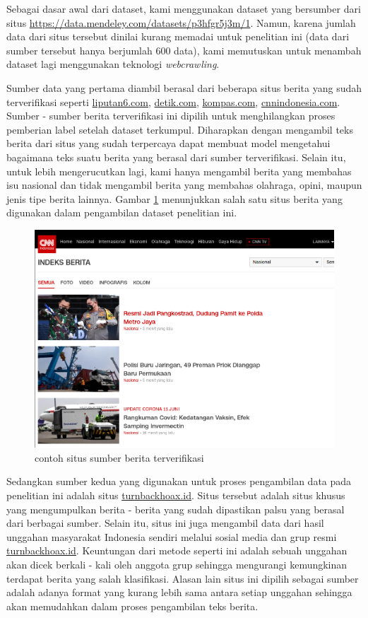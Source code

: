 Sebagai dasar awal dari dataset, kami menggunakan dataset yang bersumber dari situs \url{https://data.mendeley.com/datasets/p3hfgr5j3m/1}. Namun, karena jumlah data dari situs tersebut dinilai kurang memadai untuk penelitian ini (data dari sumber tersebut hanya berjumlah 600 data), kami memutuskan untuk menambah dataset lagi menggunakan teknologi \textit{webcrawling}.

Sumber data yang pertama diambil berasal dari beberapa situs berita yang sudah terverifikasi seperti \url{liputan6.com}, \url{detik.com}, \url{kompas.com}, \url{cnnindonesia.com}. Sumber - sumber berita terverifikasi ini dipilih untuk menghilangkan proses pemberian label setelah dataset terkumpul. Diharapkan dengan mengambil teks berita dari situs yang sudah terpercaya dapat membuat model mengetahui bagaimana teks suatu berita yang berasal dari sumber terverifikasi. Selain itu, untuk lebih mengerucutkan lagi, kami hanya mengambil berita yang membahas isu nasional dan tidak mengambil berita yang membahas olahraga, opini, maupun jenis tipe berita lainnya. Gambar \ref{fig: news_source} menunjukkan salah satu situs berita yang digunakan dalam pengambilan dataset penelitian ini.

\begin{figure}[h!]
  \begin{center}
    \includegraphics[width= .9\linewidth]{gambar/cnn_news.png}
    \caption{contoh situs sumber berita terverifikasi}
    \label{fig: news_source}
  \end{center}
\end{figure}

Sedangkan sumber kedua yang digunakan untuk proses pengambilan data pada penelitian ini adalah situs \url{turnbackhoax.id}. Situs tersebut adalah situs khusus yang mengumpulkan berita - berita yang sudah dipastikan palsu yang berasal dari berbagai sumber. Selain itu, situs ini juga mengambil data dari hasil unggahan masyarakat Indonesia sendiri melalui sosial media dan grup resmi \url{turnbackhoax.id}. Keuntungan dari metode seperti ini adalah sebuah unggahan akan dicek berkali - kali oleh anggota grup sehingga mengurangi kemungkinan terdapat berita yang salah klasifikasi. Alasan lain situs ini dipilih sebagai sumber adalah adanya format yang kurang lebih sama antara setiap unggahan sehingga akan memudahkan dalam proses pengambilan teks berita.

